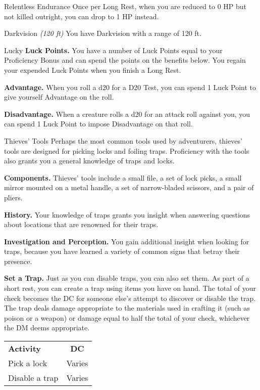 \begin{Card}{Relentless Endurance}
Once per Long Rest, when you are reduced to 0 HP but not killed outright, you can drop to 1 HP instead.
\end{Card}


\begin{Card}{Darkvision \textit{(120 ft)}}
You have Darkvision with a range of 120 ft.
\end{Card}


\begin{Card}{Lucky}
\textbf{Luck Points.} You have a number of Luck Points equal to your Proficiency Bonus and can spend the points on the benefits below. You regain your expended Luck Points when you finish a Long Rest.

\textbf{Advantage.} When you roll a d20 for a D20 Test, you can spend 1 Luck Point to give yourself Advantage on the roll.

\textbf{Disadvantage.} When a creature rolls a d20 for an attack roll against you, you can spend 1 Luck Point to impose Disadvantage on that roll.
\end{Card}

\begin{Card}{Thieves' Tools}
Perhaps the most common tools used by adventurers, thieves' tools are designed for picking locks and foiling traps. Proficiency with the tools also grants you a general knowledge of traps and locks.

\textbf{Components.} Thieves' tools include a small file, a set of lock picks, a small mirror mounted on a metal handle, a set of narrow-bladed scissors, and a pair of pliers.

\textbf{History.} Your knowledge of traps grants you insight when answering questions about locations that are renowned for their traps.

\textbf{Investigation and Perception.} You gain additional insight when looking for traps, because you have learned a variety of common signs that betray their presence.

\textbf{Set a Trap.} Just as you can disable traps, you can also set them. As part of a short rest, you can create a trap using items you have on hand. The total of your check becomes the DC for someone else's attempt to discover or disable the trap. The trap deals damage appropriate to the materials used in crafting it (such as poison or a weapon) or damage equal to half the total of your check, whichever the DM deems appropriate.

\begin{tabular}{lc}
\textbf{Activity} & \textbf{DC} \\
Pick a lock & Varies \\
Disable a trap & Varies \\
\end{tabular}
\end{Card}


